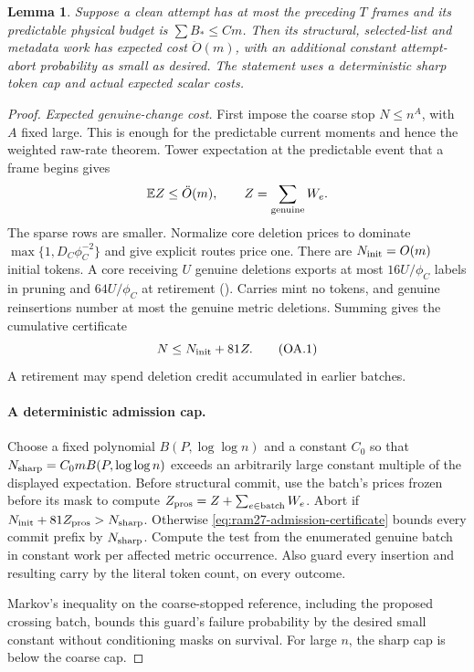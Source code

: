 \documentclass[11pt]{article}
\newtheorem{lemma}[theorem]{Lemma}
\theoremstyle{remark}
\newcommand{\Ex}{\mathbb E}
\renewcommand{\O}{\ddot{O}}
\begin{document}
\begin{lemma}
\label{prop:ram27-owner-attempt}
Suppose a clean attempt has at most the preceding $T$ frames and its predictable
physical budget is $\sum B_*\le Cm$.
Then its structural, selected-list and metadata work has expected cost
$\O(m)$, with an additional constant attempt-abort probability as small
as desired.
The statement uses a deterministic sharp token cap and actual expected scalar
costs.
\end{lemma} \begin{proof} \emph{Expected genuine-change cost.} First impose the
coarse stop $N\le n^A$, with $A$ fixed large.
This is enough for the predictable current moments and hence the weighted
raw-rate theorem.
Tower expectation at the predictable event that a frame begins gives
\[
 \Ex Z\le \O(m),
 \qquad Z=\sum_{\rm genuine}W_e.
\]
The sparse rows are smaller.
Normalize core deletion prices to dominate $\max\{1,D_C\phi_C^{-2}\}$ and give
explicit routes price one.
There are $N_{\rm init}=O(m)$ initial tokens.
A core receiving $U$ genuine deletions exports at most $16U/\phi_C$ labels in
pruning and $64U/\phi_C$ at retirement ().
Carries mint no tokens, and genuine reinsertions number at most the genuine
metric deletions.
Summing gives the cumulative certificate
\[
             N\le N_{\rm init}+81Z.                 \tag{OA.1}\label{eq:ram27-admission-certificate}
\]
A retirement may spend deletion credit accumulated in earlier batches.

\paragraph{A deterministic admission cap.}
Choose a fixed polynomial $B(P,\log\log n)$ and a constant $C_0$ so that $N_{\rm
sharp}=C_0mB(P,\log\log n)$ exceeds an arbitrarily large constant multiple of the
displayed expectation.
Before structural commit, use the batch's prices frozen before its mask to
compute $Z_{\rm pros}=Z+\sum_{e\in\mathrm{batch}}W_e$.
Abort if $N_{\rm init}+81Z_{\rm pros}>N_{\rm sharp}$.
Otherwise \eqref{eq:ram27-admission-certificate} bounds every commit prefix by
$N_{\rm sharp}$.
Compute the test from the enumerated genuine batch in constant work per affected
metric occurrence.
Also guard every insertion and resulting carry by the literal token count, on
every outcome.

Markov's inequality on the coarse-stopped reference, including the proposed
crossing batch, bounds this guard's failure probability by the desired small
constant without conditioning masks on survival.
For large $n$, the sharp cap is below the coarse cap.


\end{proof}
\end{document}
